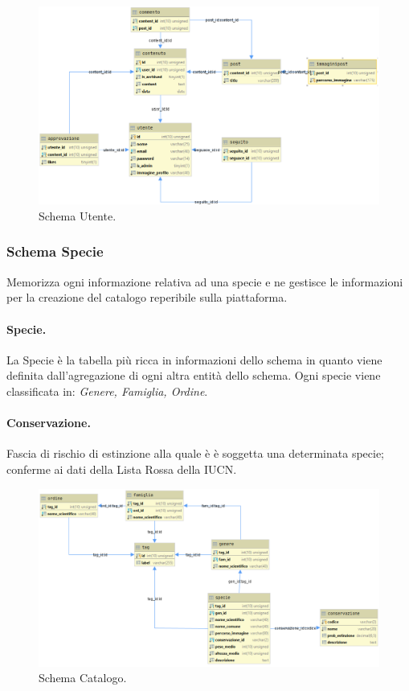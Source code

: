 \documentclass[12pt, a4paper]{article}
\begin{document}
    \begin{figure}[htbp]
        \caption{Schema Utente.}
        \label{fig:database1}
        \hspace*{-2cm}
        \includegraphics[scale= 0.5]{webBirdDB@localhostUser.png}
    \end{figure}


    \subsubsection{Schema Specie}
    Memorizza ogni informazione relativa ad una specie e ne gestisce le informazioni per la creazione del
    catalogo reperibile sulla piattaforma.
    \paragraph{Specie.} La Specie è la tabella  più ricca in informazioni dello schema in quanto viene definita
    dall'agregazione di ogni altra entità dello schema.
    Ogni specie viene classificata in: \emph{Genere, Famiglia, Ordine}.
    \paragraph{Conservazione.} Fascia di rischio di estinzione alla quale è è soggetta una determinata
    specie; conferme ai dati della Lista Rossa della IUCN.

    \begin{figure}[htbp]
        \caption{Schema Catalogo.}
        \label{fig:database2}
        \hspace*{-2cm}
        \includegraphics[scale= 0.5]{webBirdDB@localhostBirds.png}
    \end{figure}
\end{document}
